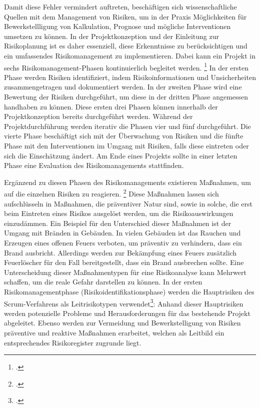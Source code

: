 Damit diese Fehler vermindert auftreten, beschäftigen sich wissenschaftliche Quellen mit dem Management von Risiken,
um in der Praxis Möglichkeiten für Bewerkstellligung von Kalkulation, Prognose und mögliche Interventionen umsetzen zu können.
In der Projektkonzeption und der Einleitung zur Risikoplanung ist es daher essenziell, diese Erkenntnisse zu berücksichtigen
und ein umfassendes Risikomanagement zu implementieren. Dabei kann ein Projekt in sechs Risikomanagement-Phasen kontinuierlich begleitet werden.
\footcite[Vgl.][45]{dikmenLearningRisksTool2008}
In der ersten Phase werden Risiken identifiziert, indem Risikoinformationen und Unsicherheiten zusammengetragen und dokumentiert werden.
In der zweiten Phase wird eine Bewertung der Risiken durchgeführt, um diese in der dritten Phase angemessen handhaben zu können.
Diese ersten drei Phasen können innerhalb der Projektkonzeption bereits durchgeführt werden.
Während der Projektdurchführung werden iterativ die Phasen vier und fünf durchgeführt. Die vierte
Phase beschäftigt sich mit der Überwachung von Risiken und die fünfte Phase mit den Interventionen im
Umgang mit Risiken, falls diese eintreten oder sich die Einschätzung ändert. Am Ende eines Projekts
sollte in einer letzten Phase eine Evaluation des Risikomanagements stattfinden.

Ergänzend zu diesen Phasen des Risikomanagements existieren Maßnahmen, um auf die einzelnen Risiken zu reagieren.
\footcite[Vgl.][S. 22 f.]{brandstaeterAgileITProjekteErfolgreich2013}
Diese Maßnahmen lassen sich aufschlüsseln in Maßnahmen, die präventiver Natur sind, sowie in solche, die erst beim Eintreten
eines Risikos ausgelöst werden, um die Risikoauswirkungen einzudämmen.
Ein Beispiel für den Unterschied dieser Maßnahmen ist der Umgang mit Bränden in Gebäuden.
In vielen Gebäuden ist das Rauchen und Erzeugen eines offenen Feuers verboten, um präventiv zu verhindern, dass ein Brand ausbricht.
Allerdings werden zur Bekämpfung eines Feuers zusätzlich Feuerlöscher für den Fall bereitgestellt, dass ein Brand ausbrechen sollte.
Eine Unterscheidung dieser Maßnahmentypen für eine Risikoanalyse kann Mehrwert schaffen, um die reale Gefahr darstellen zu können.
In der ersten Risikomanagementphase (Risikoidentifikationsphase) werden die Hauptrisiken des Scrum-Verfahrens
als Leitrisikotypen verwendet\footcite[Vgl.][40]{brandstaeterAgileITProjekteErfolgreich2013}: 
Anhand dieser Hauptrisiken werden potenzielle Probleme und Herausforderungen für das bestehende Projekt abgeleitet.
Ebenso werden zur Vermeidung und Bewerkstelligung von Risiken präventive und reaktive Maßnahmen erarbeitet, welchen
als Leitbild ein entsprechendes Risikoregister zugrunde liegt.
